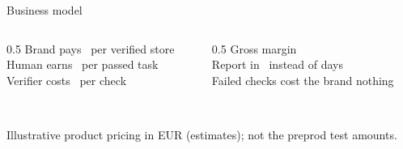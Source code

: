 \begin{frame}{Business model}
  \centering
  \begin{columns}[T]
    \begin{column}{0.5\textwidth}
      \alert{Brand pays} \PricePerStore\ per verified store\\[0.5em]
      \alert{Human earns} \PayoutPerTask\ per passed task\\[0.5em]
      \alert{Verifier costs} \VerifierFee\ per check
    \end{column}
    \begin{column}{0.5\textwidth}
      \alert{Gross margin} \GrossMargin\\[0.5em]
      \alert{Report in} \TimeToReport\ instead of days\\[0.5em]
      \alert{Failed checks cost the brand} nothing
    \end{column}
  \end{columns}
  \vspace{1em}{\small €12 pay-as-you-go \,\textbullet\, €399/month for 50 checks \,\textbullet\, €5--6 at volume}\\[0.4em]{\scriptsize Illustrative product pricing in EUR (estimates); not the preprod test amounts.}
\end{frame}
